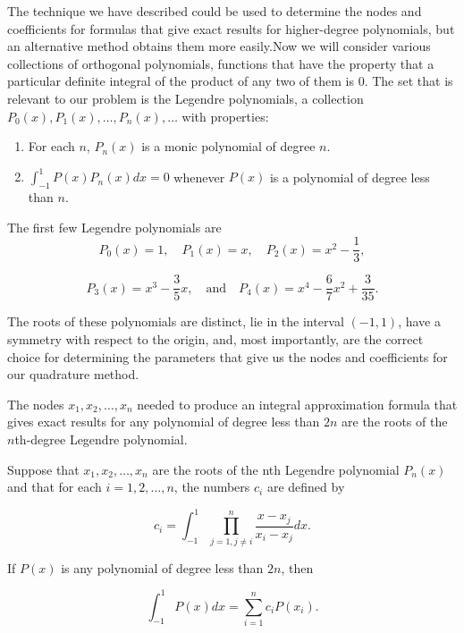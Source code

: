 \documentclass[preprint,12pt]{elsarticle}
\begin{document}
The technique we have described could be used to determine the nodes and coefficients for formulas that give exact results for higher-degree polynomials, but an alternative method obtains them more easily.Now we will consider various collections of orthogonal polynomials, functions that have the property that a particular definite integral of the product of any two of them is 0. The set that is relevant to our problem is the Legendre polynomials, a collection ${P_{0}(x),P_{1}(x),\dots, P_{n}(x),\dots}$ with properties:

\begin{enumerate}
\item For each $n$, $P_{n}(x)$ is a monic polynomial of degree $n$.
\item $\int_{-1}^{1}P(x)P_{n}(x)dx=0$ whenever $P(x)$ is a polynomial of degree less than $n$.
\end{enumerate}

The first few Legendre polynomials are
\begin{equation}
\nonumber
    P_{0}(x)=1,\quad P_{1}(x)=x,\quad P_{2}(x)=x^{2}-\frac{1}{3},
\end{equation}

\begin{equation}
    P_{3}(x)=x^{3}-\frac{3}{5}x,\quad \mathrm{and} \quad P_{4}(x)=x^{4}-\frac{6}{7}x^{2}+\frac{3}{35}.
\end{equation}

The roots of these polynomials are distinct, lie in the interval $(-1,1)$, have a symmetry with respect to the origin, and, most importantly, are the correct choice for determining the parameters that give us the nodes and coefficients for our quadrature method.

The nodes $x_1,x_2,\dots,x_n$ needed to produce an integral approximation formula that gives exact results for any polynomial of degree less than $2n$ are the roots of the $n$th-degree Legendre polynomial.

Suppose that $x_1,x_2,\dots,x_n$ are the roots of the nth Legendre polynomial $P_{n}(x)$ and that for each $i=1,2,\dots,n$, the numbers $c_i$ are defined by

\begin{equation}
\label{eq:cg1}
    c_{i}=\int_{-1}^{1} \prod_{j=1,j\neq i}^{n} \frac{x-x_j}{x_{i}-x_j}dx.
\end{equation}

If $P(x)$ is any polynomial of degree less than $2n$, then

\begin{equation}
    \int_{-1}^{1} P(x)dx = \sum_{i=1}^{n} c_{i}P(x_i).
\end{equation}
\end{document}
